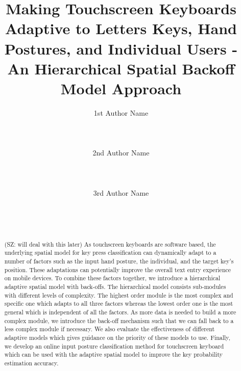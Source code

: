 \documentclass{sigchi}
\begin{document}
\title{Making Touchscreen Keyboards Adaptive to Letters Keys, Hand Postures,  and Individual Users - An Hierarchical Spatial Backoff Model Approach}

\author{
  \alignauthor 1st Author Name\\
    \\
    \\
    \\
  \alignauthor 2nd Author Name\\
    \\
    \\
    \\
  \alignauthor 3rd Author Name\\
    \\
    \\
    \\
}


\maketitle

\begin{abstract}
(SZ: will deal with this later) As touchscreen keyboards are software based, the underlying spatial model for key press
classification can dynamically adapt to a number of factors such as the input 
hand posture, the individual, and the target key's position. These adaptations can
potentially improve the overall text entry experience on mobile devices. To 
combine these factors together, we introduce a hierarchical adaptive spatial 
model with back-offs. The hierarchical model consists sub-modules with different levels of
complexity. The highest order module is the most complex and specific one which adapts to 
all three factors whereas the lowest order one is the most general which is independent
of all the factors. As more data is needed to build a more complex module, we introduce
the back-off mechanism such that we can fall back to a less complex module if necessary.
We also evaluate the effectiveness of different adaptive models which gives 
guidance on the priority of these models to use. Finally, we
develop an online input posture classification method for touchscreen keyboard which can be
used with the adaptive spatial model to improve the key probability estimation accuracy.
 
\end{abstract}
\end{document}
